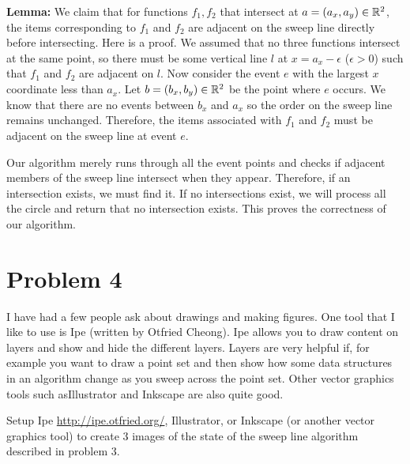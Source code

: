 \documentclass[11pt]{article}
\begin{document}
{\bf Lemma: }
We claim that for functions $f_1, f_2$ that intersect at $a = (a_x, a_y) \in \mathbb{R} ^2$, the items corresponding to $f_1$ and $f_2$ are adjacent on the sweep line directly before intersecting.
Here is a proof.
We assumed that no three functions intersect at the same point, so there must be some vertical line $l$ at $x = a_x - \epsilon$ ($\epsilon > 0$) such that $f_1$ and $f_2$ are adjacent on $l$.
Now consider the event $e$ with the largest $x$ coordinate less than $a_x$.
Let $b = (b_x, b_y) \in \mathbb{R} ^2$ be the point where $e$ occurs.
We know that there are no events between $b_x$ and $a_x$ so the order on the sweep line remains unchanged.
Therefore, the items associated with $f_1$ and $f_2$ must be adjacent on the sweep line at event $e$.

Our algorithm merely runs through all the event points and checks if adjacent members of the sweep line intersect when they appear.
Therefore, if an intersection exists, we must find it.
If no intersections exist, we will process all the circle and return that no intersection exists.
This proves the correctness of our algorithm.

\newpage
\section*{Problem 4}

I have had a few people ask about drawings and making figures.  One tool that I
like to use is Ipe (written by Otfried Cheong).  Ipe allows you to draw content
on layers and show and hide the different layers.  Layers are very helpful if,
for example you want to draw a point set and then show how some data structures
in an algorithm change as you sweep across the point set.
Other vector graphics tools such asIllustrator and Inkscape are also quite good.

Setup Ipe \url{http://ipe.otfried.org/}, Illustrator, or Inkscape
(or another vector graphics tool)
to create 3 images of the state of the sweep line algorithm
described in problem 3.

%
%
\end{document}
